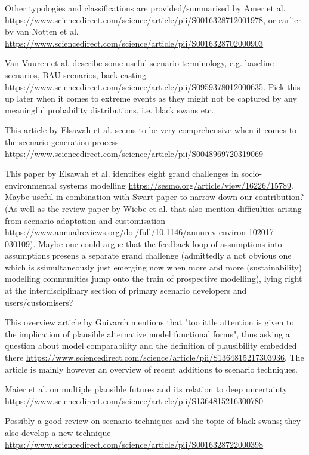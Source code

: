 \documentclass{article}
\begin{document}
Other typologies and classifications are provided/summarised by Amer et al. \url{https://www.sciencedirect.com/science/article/pii/S0016328712001978}, or earlier by van Notten et al. \url{https://www.sciencedirect.com/science/article/pii/S0016328702000903}

Van Vuuren et al. describe some useful scenario terminology, e.g. baseline scenarios, BAU scenarios, back-casting \url{https://www.sciencedirect.com/science/article/pii/S0959378012000635}. Pick this up later when it comes to extreme events as they might not be captured by any meaningful probability distributions, i.e. black swans etc..

This article by Elsawah et al. seems to be very comprehensive when it comes to the scenario generation process \url{https://www.sciencedirect.com/science/article/pii/S0048969720319069}

This paper by Elsawah et al. identifies eight grand challenges in socio-environmental systems modelling \url{https://sesmo.org/article/view/16226/15789}. Maybe useful in combination with Swart paper to narrow down our contribution? (As well as the review paper by Wiebe et al. that also mention difficulties arising from scenario adaptation and customisation \url{https://www.annualreviews.org/doi/full/10.1146/annurev-environ-102017-030109}). Maybe one could argue that the feedback loop of assumptions into assumptions presens a separate grand challenge (admittedly a not obvious one which is ssimultaneously just emerging now when more and more (sustainability) modelling communities jump onto the train of prospective modelling), lying right at the interdisciplinary section of primary scenario developers and users/customisers?

This overview article by Guivarch mentions that "too ittle attention is given to the implication of plausible alternative model functional forms", thus asking a question about model comparability and the definition of plausibility embedded there \url{https://www.sciencedirect.com/science/article/pii/S1364815217303936}. The article is mainly however an overview of recent additions to scenario techniques.

Maier et al. on multiple plausible futures and its relation to deep uncertainty \url{https://www.sciencedirect.com/science/article/pii/S1364815216300780}

Possibly a good review on scenario techniques and the topic of black swans; they also develop a new technique \url{https://www.sciencedirect.com/science/article/pii/S0016328722000398}
\end{document}
